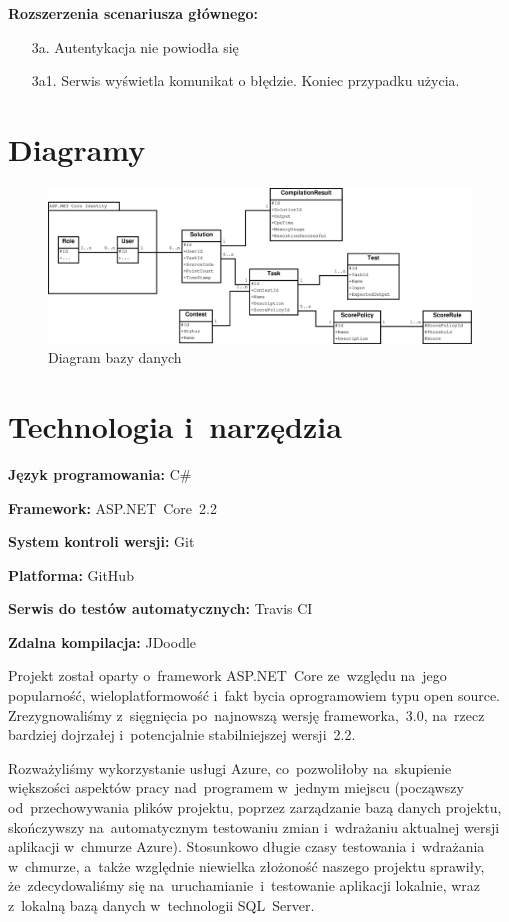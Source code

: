 \documentclass{article}
\begin{document}
\textbf{Rozszerzenia scenariusza głównego:}
\begin{itemize}
	\item[3a.] Autentykacja nie powiodła się
	\item[3a1.] Serwis wyświetla komunikat o błędzie. Koniec przypadku użycia.
\end{itemize}

\newpage
\section{Diagramy}

\begin{figure}[H]
	\includegraphics[width=\linewidth]{entityDiagram.eps}
	\caption{Diagram bazy danych}
\end{figure}

\section{Technologia i~narzędzia}

\textbf{Język programowania:} C\#

\textbf{Framework:} ASP.NET~Core~2.2

\textbf{System kontroli wersji:} Git

\textbf{Platforma:} GitHub

\textbf{Serwis do testów automatycznych:} Travis CI

\textbf{Zdalna kompilacja:} JDoodle

Projekt został oparty o~framework ASP.NET~Core ze~względu na~jego popularność, wieloplatformowość i~fakt bycia oprogramowiem typu open source. Zrezygnowaliśmy z~sięgnięcia po~najnowszą wersję frameworka,~3.0, na~rzecz bardziej dojrzałej i~potencjalnie stabilniejszej wersji~2.2.

Rozważyliśmy wykorzystanie usługi Azure, co~pozwoliłoby na~skupienie większości aspektów pracy nad~programem w~jednym miejscu (począwszy od~przechowywania plików projektu, poprzez zarządzanie bazą danych projektu, skończywszy na~automatycznym testowaniu zmian i~wdrażaniu aktualnej wersji aplikacji w~chmurze Azure). Stosunkowo długie czasy testowania i~wdrażania w~chmurze, a~także względnie niewielka złożoność naszego projektu sprawiły, że~zdecydowaliśmy się na~uruchamianie~i~testowanie aplikacji lokalnie, wraz z~lokalną bazą danych w~technologii SQL~Server.
\end{document}
